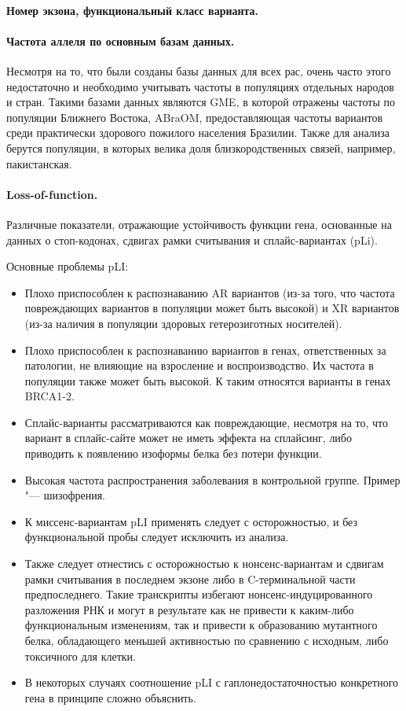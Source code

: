 \documentclass[a4paper,12pt]{article}
\begin{document}
\paragraph{Номер экзона, функциональный класс варианта.}

\paragraph{Частота аллеля по основным базам данных.}
Несмотря на то, что были созданы базы данных для всех рас, очень часто этого недостаточно и необходимо учитывать частоты в популяциях отдельных народов и стран.
Такими базами данных являются GME\cite{gme}, в которой отражены частоты по популяции Ближнего Востока, ABraOM\cite{abraom}, предоставляющая частоты вариантов среди практически здорового пожилого населения Бразилии.
Также для анализа берутся популяции, в которых велика доля близкородственных связей, например, пакистанская\cite{saleheen}.


\paragraph{Loss-of-function.}
Различные показатели, отражающие устойчивость функции гена, основанные на данных о стоп-кодонах, сдвигах рамки считывания и сплайс-вариантах (pLi).

Основные проблемы pLI:

\begin{itemize}
\item Плохо приспособлен к распознаванию AR вариантов (из-за того, что частота повреждающих вариантов в популяции может быть высокой) и XR вариантов (из-за наличия в популяции здоровых гетерозиготных носителей).
\item Плохо приспособлен к распознаванию вариантов в генах, ответственных за патологии, не влияющие на взросление и воспроизводство.
Их частота в популяции также может быть высокой.
К таким относятся варианты в генах BRCA1-2.
\item Сплайс-варианты рассматриваются как повреждающие, несмотря на то, что вариант в сплайс-сайте может не иметь эффекта на сплайсинг, либо приводить к появлению изоформы белка без потери функции.
\item Высокая частота распространения заболевания в контрольной группе.
Пример "--- шизофрения.
\item К миссенс-вариантам pLI применять следует с осторожностью, и без функциональной пробы следует исключить из анализа.
\item Также следует отнестись с осторожностью к нонсенс-вариантам и сдвигам рамки считывания в последнем экзоне либо в C-терминальной части предпоследнего.
Такие транскрипты избегают нонсенс-индуцированного разложения РНК и могут в результате как не привести к каким-либо функциональным изменениям, так и привести к образованию мутантного белка, обладающего меньшей активностью по сравнению с исходным, либо токсичного для клетки.
\item В некоторых случаях соотношение pLI с гаплонедостаточностью конкретного гена в принципе сложно объяснить\cite{ziegler}.
\end{itemize}
\end{document}
